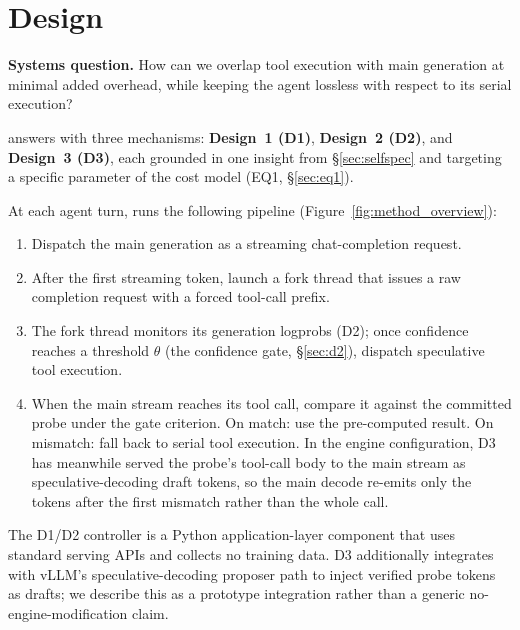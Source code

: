 \section{\spork{} Design}
\label{sec:design}

\begin{tcolorbox}[
  colback=blue!3!white,
  colframe=blue!45!black,
  boxrule=0.45pt,
  arc=1.5pt,
  left=4pt,
  right=4pt,
  top=3pt,
  bottom=3pt
]
\textbf{Systems question.}
How can we overlap tool execution with main generation at minimal added overhead,
while keeping the agent lossless with respect to its serial execution?
\end{tcolorbox}

\noindent \spork{} answers with three mechanisms: \textbf{Design~1 (D1)},
\textbf{Design~2 (D2)}, and \textbf{Design~3 (D3)}, each grounded in one insight
from \S\ref{sec:selfspec} and targeting a specific parameter of the cost model
(EQ1, \S\ref{sec:eq1}).

At each agent turn, \spork{} runs the following pipeline (Figure~\ref{fig:method_overview}):
\begin{enumerate}
\item Dispatch the main generation as a streaming chat-completion request.
\item After the first streaming token, launch a fork thread that issues a raw
      completion request with a forced tool-call prefix.
\item The fork thread monitors its generation logprobs (D2); once confidence reaches a
      threshold $\theta$ (the confidence gate, \S\ref{sec:d2}), dispatch speculative
      tool execution.
\item When the main stream reaches its tool call, compare it against the committed
      probe under the gate criterion. On match: use the pre-computed result.
      On mismatch: fall back to serial tool execution. In the engine configuration,
      D3 has meanwhile served the probe's tool-call body to the main stream as
      speculative-decoding draft tokens, so the main decode re-emits only the tokens
      after the first mismatch rather than the whole call.
\end{enumerate}

The D1/D2 controller is a Python application-layer component that uses standard serving
APIs and collects no training data.
D3 additionally integrates with vLLM's speculative-decoding proposer path to inject
verified probe tokens as drafts; we describe this as a prototype integration rather than
a generic no-engine-modification claim.

